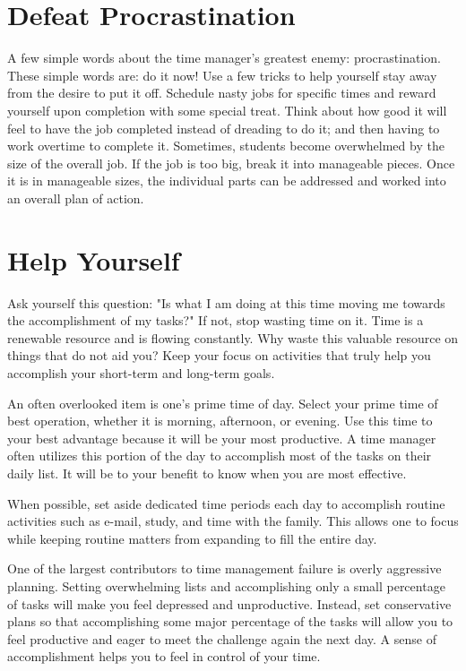 \documentclass[twocolumn]{article}
\begin{document}
\section*{Defeat Procrastination}
\noindent
A few simple words about the time manager's greatest enemy: procrastination.
These simple words are: do it now! Use a few tricks to help yourself stay away
from the desire to put it off. Schedule nasty jobs for specific times and reward
yourself upon completion with some special treat. Think about how good it will
feel to have the job completed instead of dreading to do it; and then having to
work overtime to complete it. Sometimes, students become overwhelmed by the size
of the overall job. If the job is too big, break it into manageable pieces.
Once it is in manageable sizes, the individual parts can be addressed and worked
into an overall plan of action.

\section*{Help Yourself}
\noindent
Ask yourself this question: "Is what I am doing at this time moving me towards
the accomplishment of my tasks?" If not, stop wasting time on it. Time is a
renewable resource and is flowing constantly. Why waste this valuable resource
on things that do not aid you? Keep your focus on activities that truly help you
accomplish your short-term and long-term goals.

An often overlooked item is one’s prime time of day. Select your prime time of
best operation, whether it is morning, afternoon, or evening. Use this time to
your best advantage because it will be your most productive. A time manager
often utilizes this portion of the day to accomplish most of the tasks on their
daily list. It will be to your benefit to know when you are most effective.

When possible, set aside dedicated time periods each day to accomplish routine
activities such as e-mail, study, and time with the family. This allows one to
focus while keeping routine matters from expanding to fill the entire day.

One of the largest contributors to time management failure is overly aggressive
planning. Setting overwhelming lists and accomplishing only a small percentage
of tasks will make you feel depressed and unproductive. Instead, set conservative
plans so that accomplishing some major percentage of the tasks will allow you
to feel productive and eager to meet the challenge again the next day. A sense
of accomplishment helps you to feel in control of your time.
\end{document}
